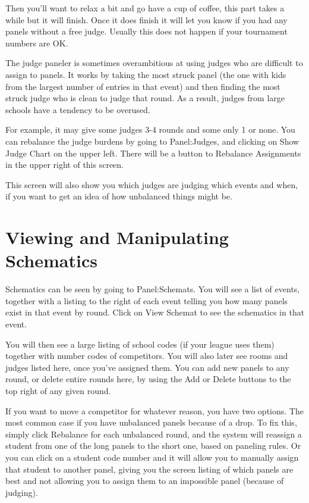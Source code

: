 \documentclass[12pt]{report} \usepackage {fullpage} \usepackage{times}
\begin{document}
Then you'll want to relax a bit and go have a cup of coffee, this part
takes a while but it will finish.   Once it does finish it will let you
know if you had any panels without a free judge.   Usually this does not
happen if your tournament numbers are OK.

The judge paneler is sometimes overambitious at using judges who are
difficult to assign to panels.  It works by taking the most struck
panel (the one with kids from the largest number of entries in that event)
and then finding the most struck judge who is clean to judge that
round.  As a result, judges from large schools have a tendency to be
overused.  

For example, it may give some judges 3-4 rounds and some only 1 or none.
You can rebalance the judge burdens by going to Panel:Judges, and clicking
on Show Judge Chart on the upper left.  There will be a button to Rebalance
Assignments in the upper right of this screen.  

This screen will also show you which judges are judging which events and
when, if you want to get an idea of how unbalanced things might be.

 \section{Viewing and Manipulating Schematics}

Schematics can be seen by going to Panel:Schemats.   You will see a list of
events, together with a listing to the right of each event telling you how
many panels exist in that event by round.  Click on View Schemat to see the
schematics in that event.

You will then see a large listing of school codes (if your league uses
them) together with number codes of competitors.  You will also later see
rooms and judges listed here, once you've assigned them.   You can add new
panels to any round, or delete entire rounds here, by using the Add or
Delete buttons to the top right of any given round.    

If you want to move a competitor for whatever reason, you have two options.
The most common case if you have unbalanced panels because of a drop.  To
fix this, simply click Rebalance for each unbalanced round, and the system
will reassign a student from one of the long panels to the short one, based
on paneling rules.  Or you can click on a student code number and it will
allow you to manually assign that student to another panel, giving you the
screen listing of which panels are best and not allowing you to assign them
to an impossible panel (because of judging).
\end{document}
